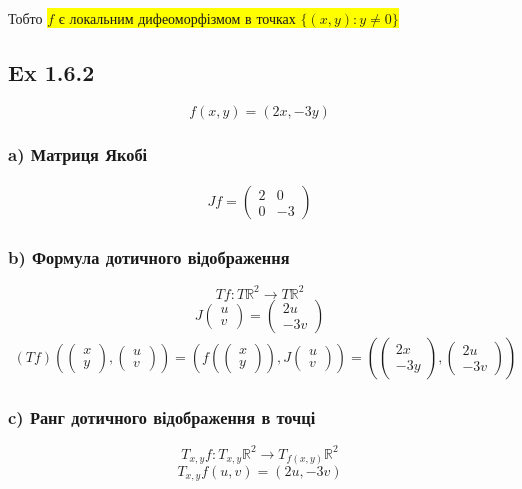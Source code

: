 \documentclass[10pt, a4paper]{article} %
\newcommand{\R}{\mathbb{R}}
\begin{document}
Тобто \colorbox{yellow}{$f$ є локальним дифеоморфізмом в точках $\{(x,y) : y\ne 0\}$}

\subsection*{Ex 1.6.2}
\[f(x,y) = (2x,-3y)\]
\subsubsection*{a) Матриця Якобі}
\begin{align*}
    Jf = \begin{pmatrix}
        2 & 0\\
        0 & -3
    \end{pmatrix}
\end{align*}

\subsubsection*{b) Формула дотичного відображення}
\[Tf : T\R^2 \to T\R^2\]
\[J\begin{pmatrix}u\\v\end{pmatrix} = \begin{pmatrix}2u\\-3v\end{pmatrix}\]
\begin{align*}
    (Tf)\left(\begin{pmatrix}x\\y\end{pmatrix} , \begin{pmatrix}u\\v\end{pmatrix}\right)
    = \left(f(\begin{pmatrix}x\\y\end{pmatrix}) , J\begin{pmatrix}u\\v\end{pmatrix}\right)
    = \left(\begin{pmatrix}2x\\-3y\end{pmatrix} , \begin{pmatrix}2u\\-3v\end{pmatrix}\right)
\end{align*}

\subsubsection*{c) Ранг дотичного відображення в точці}
\[T_{x,y}f : T_{x,y}\R^2 \to T_{f(x,y)}\R^2\]
\[T_{x,y}f(u,v) = (2u, -3v)\]
\end{document}
